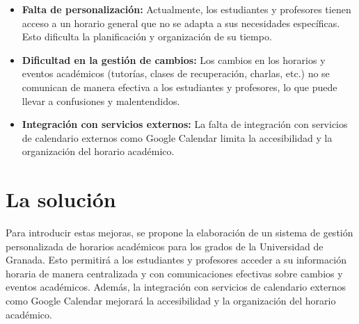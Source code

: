 \begin{itemize}
    \item \textbf{Falta de personalización:} Actualmente, los estudiantes y profesores tienen acceso a un horario general que no se adapta a sus necesidades específicas. Esto dificulta la planificación y organización de su tiempo.
    \item \textbf{Dificultad en la gestión de cambios:} Los cambios en los horarios y eventos académicos (tutorías, clases de recuperación, charlas, etc.) no se comunican de manera efectiva a los estudiantes y profesores, lo que puede llevar a confusiones y malentendidos.
    \item \textbf{Integración con servicios externos:} La falta de integración con servicios de calendario externos como Google Calendar limita la accesibilidad y la organización del horario académico.
\end{itemize}



\section{La solución}



Para introducir estas mejoras, se propone la elaboración de un sistema de gestión personalizada de horarios académicos para los grados de la Universidad de Granada. 
Esto permitirá a los estudiantes y profesores acceder a su información horaria de manera centralizada y con comunicaciones efectivas sobre cambios y eventos académicos. Además, la integración con servicios de calendario externos como Google Calendar mejorará la accesibilidad y la organización del horario académico.

